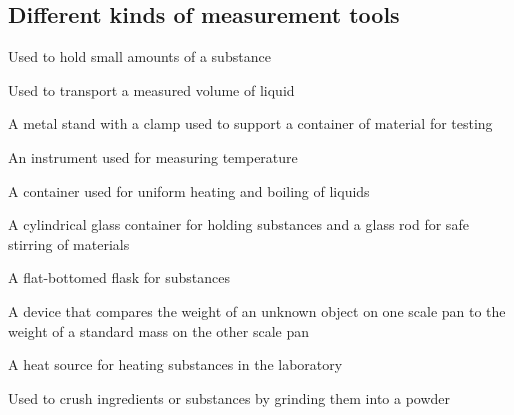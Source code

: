 
\subsection*{Different kinds of measurement tools}

\begin{definition}
    Used to hold small amounts of a substance
\end{definition}

\begin{definition}
    Used to transport a measured volume of liquid
\end{definition}

\begin{definition}
    A metal stand with a clamp used to support a container of material for
    testing
\end{definition}

\begin{definition}[Thermometer]
    An instrument used for measuring temperature
\end{definition}

\begin{definition}
    A container used for uniform heating and boiling of liquids
\end{definition}

\begin{definition}
    A cylindrical glass container for holding substances and a glass rod for
    safe stirring of materials
\end{definition}

\begin{definition}
    A flat-bottomed flask for substances
\end{definition}

\begin{definition}
    A device that compares the weight of an unknown object on one scale pan to
    the weight of a standard mass on the other scale pan
\end{definition}

\begin{definition}
    A heat source for heating substances in the laboratory
\end{definition}

\begin{definition}
    Used to crush ingredients or substances by grinding them into a powder
\end{definition}

